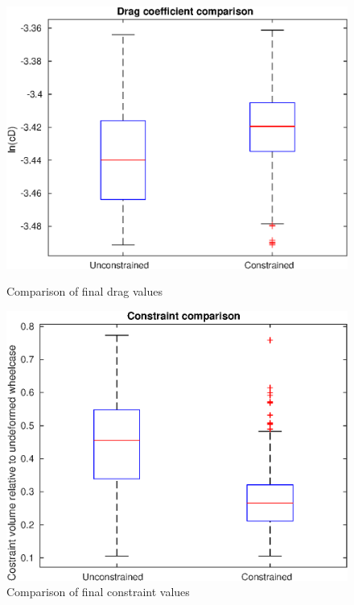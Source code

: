 \begin{figure}[h]
	
	\centering
	\begin{minipage}{0.45\textwidth}
		\centering
		\includegraphics[width=1\linewidth]{bilder/2pt500Samples/dragBoxplot}
		\caption{Comparison of final drag values}
		\label{fig:1stdragbox}
	\end{minipage}\hfill
	\begin{minipage}{0.45\textwidth}
		\centering
		\includegraphics[width=1\linewidth]{bilder/2pt500Samples/constraintBoxplot}
		\caption{Comparison of final constraint values}
		\label{fig:1stconbox}
	\end{minipage}
\end{figure}

